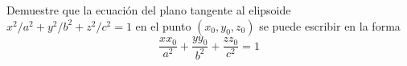 \item Demuestre que la ecuación del plano tangente al elipsoide $x^2/a^2 + y^2/b^2 + z^2/c^2 = 1$ en el punto $(x_0, y_0, z_0)$ se puede escribir en la forma
\[ \frac{xx_0}{a^2} + \frac{yy_0}{b^2} + \frac{zz_0}{c^2} = 1 \]
